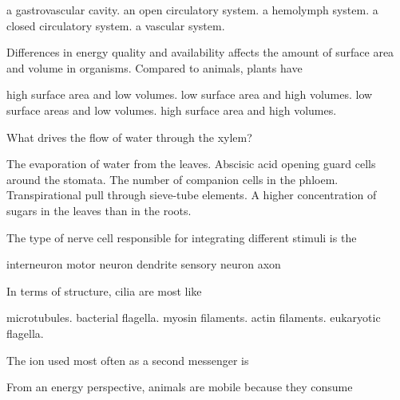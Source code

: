\begin{choices}
\choice a gastrovascular cavity. 
\choice an open circulatory system. 
\choice a hemolymph system. 
\correctchoice a closed circulatory system. 
\choice a vascular system. 
\end{choices}



\question
Differences in energy quality and availability affects the amount of surface area and volume in organisms. Compared to animals, plants have 

\begin{choices}
\correctchoice high surface area and low volumes. 
\choice low surface area and high volumes. 
\choice low surface areas and low volumes.  
\choice high surface area and high volumes. 
\end{choices}


\question
What drives the flow of water through the xylem?

\begin{choices}
\correctchoice The evaporation of water from the leaves. 
\choice Abscisic acid opening guard cells around the stomata. 
\choice The number of companion cells in the phloem.  
\choice Transpirational pull through sieve-tube elements. 
\choice A higher concentration of sugars in the leaves than in the roots. 
\end{choices}

\question
The type of nerve cell responsible for integrating different stimuli is the 

\begin{choices}
\correctchoice interneuron 
\choice motor neuron 
\choice dendrite 
\choice sensory neuron 
\choice axon 
\end{choices}

\question
In terms of structure, cilia  are most like 
\begin{choices}
\choice microtubules.  
\choice bacterial flagella. 
\choice myosin filaments. 
\choice actin filaments. 
\correctchoice eukaryotic flagella. 
\end{choices}

\question
The ion used most often as a second messenger is

\begin{choices}
\choice {} 
\choice {} 
\correctchoice {} 
\choice {} 
\choice {} 
\end{choices}

\question
From an energy perspective, animals are mobile because they consume

